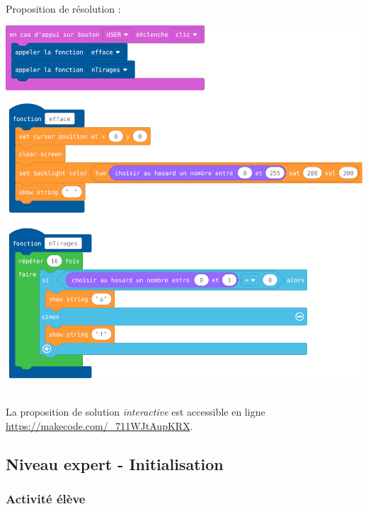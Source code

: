 \begin{minipage}[t]{0.8\linewidth}
    \begin{methode}~\\
    Proposition de résolution :
    
    \centerline{\includegraphics[width=\linewidth]{res/st-pf-02-prof.png}}
    \end{methode}
\end{minipage}
\hfill
\begin{minipage}[t]{0.2\linewidth}
    \begin{remarque}~\\
        La proposition de solution \emph{interactive} est accessible en ligne \url{https://makecode.com/_711WJtAupKRX}.
    \end{remarque}
\end{minipage}
%
%
\newpage
\subsection{Niveau expert - Initialisation}
\subsubsection{Activité élève}



